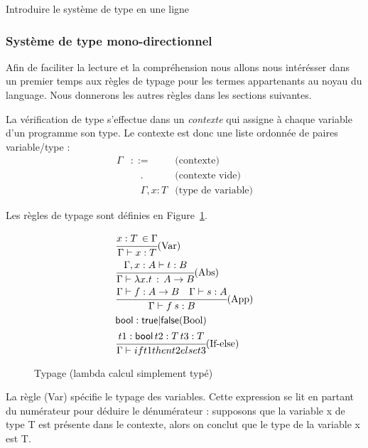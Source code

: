 \documentclass {article}
\theoremstyle{definition}
\theoremstyle{remark}
\begin{document}
Introduire le système de type en une ligne
\subsubsection{Système de type mono-directionnel}

Afin de faciliter la lecture et la compréhension nous allons nous intérésser dans 
un premier temps aux règles de typage pour les termes appartenants au noyau 
du language. Nous donnerons les autres règles dans les sections suivantes.

La vérification de type s'effectue dans un \emph{contexte} qui assigne
à chaque variable d'un programme son type. Le contexte est donc une
liste ordonnée de paires variable/type :
%
\begin{align*}
  \Gamma &::= &\mbox{(contexte)} \\
         &\quad . & \mbox{(contexte vide)} \\
         &\quad \Gamma, x : T & \mbox{(type de variable)} 
\end{align*}

Les règles de typage sont définies en Figure~\ref{fig:typage-simple}.

\begin{figure}

\begin{align*}
&  \cfrac{x:T\,\in\Gamma}
         {\Gamma\vdash x:T}\mbox{(Var)} 
  \\
&  \cfrac{\Gamma, x:A \vdash t:B}
         {\Gamma \vdash \lambda x. t \,:\, A\rightarrow B}\mbox{(Abs)} \\
&  \cfrac{\Gamma \vdash f : A\rightarrow B \quad
          \Gamma \vdash s : A}
         {\Gamma\vdash f\: s : B}\mbox{(App)} \\
&  \mathsf{bool}:\mathsf{true}|\mathsf{false}\mbox{(Bool)} \\
&  \cfrac{t1:\mathsf{bool}\,t2:T\,t3:T}
         {\Gamma\vdash if t1 then t2 else t3}\mbox{(If-else)} \\
\end{align*}

\caption{Typage (lambda calcul simplement typé)}
\label{fig:typage-simple}
\end{figure}   

La règle (Var) spécifie le typage des variables. Cette expression se
lit en partant du numérateur pour déduire le dénumérateur : supposons
que la variable x de type T est présente dans le contexte, alors on
conclut que le type de la variable x est T.
\end{document}
